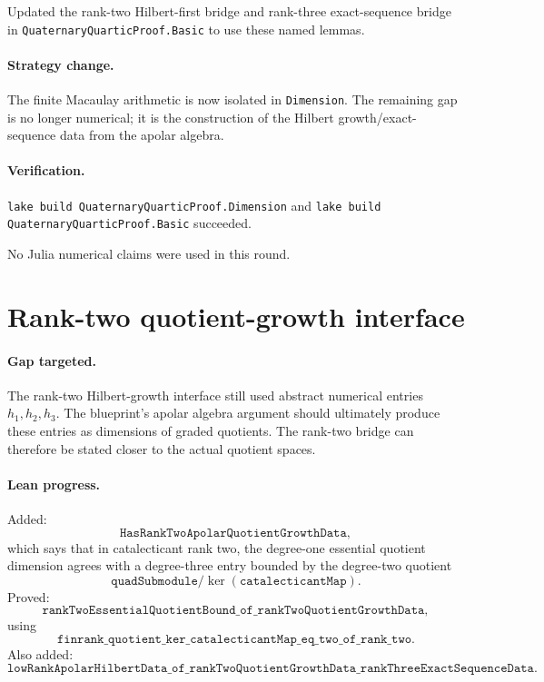 \documentclass[11pt]{article}
\begin{document}
Updated the rank-two Hilbert-first bridge and rank-three exact-sequence bridge
in \texttt{QuaternaryQuarticProof.Basic} to use these named lemmas.

\paragraph{Strategy change.}
The finite Macaulay arithmetic is now isolated in \texttt{Dimension}.  The
remaining gap is no longer numerical; it is the construction of the Hilbert
growth/exact-sequence data from the apolar algebra.

\paragraph{Verification.}
\texttt{lake build QuaternaryQuarticProof.Dimension} and
\texttt{lake build QuaternaryQuarticProof.Basic} succeeded.

No Julia numerical claims were used in this round.

\section*{Rank-two quotient-growth interface}

\paragraph{Gap targeted.}
The rank-two Hilbert-growth interface still used abstract numerical entries
\(h_1,h_2,h_3\).  The blueprint's apolar algebra argument should ultimately
produce these entries as dimensions of graded quotients.  The rank-two bridge
can therefore be stated closer to the actual quotient spaces.

\paragraph{Lean progress.}
Added:
\[
\texttt{HasRankTwoApolarQuotientGrowthData},
\]
which says that in catalecticant rank two, the degree-one essential quotient
dimension agrees with a degree-three entry bounded by the degree-two quotient
\[
\texttt{quadSubmodule}/\ker(\texttt{catalecticantMap}).
\]
Proved:
\[
\texttt{rankTwoEssentialQuotientBound\_of\_rankTwoQuotientGrowthData},
\]
using
\[
\texttt{finrank\_quotient\_ker\_catalecticantMap\_eq\_two\_of\_rank\_two}.
\]
Also added:
\[
\texttt{lowRankApolarHilbertData\_of\_rankTwoQuotientGrowthData\_rankThreeExactSequenceData}.
\]
\end{document}
